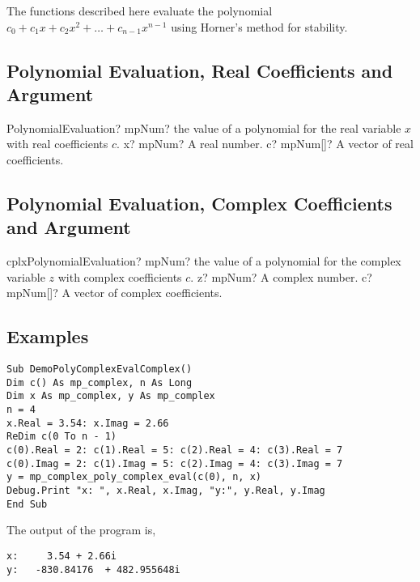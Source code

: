 The functions described here evaluate the polynomial $c_0 + c_1 x + c_2 x^2 + \ldots + c_{n- 1} x^{n-1}$ using Horner's method for stability.

\subsection{Polynomial Evaluation, Real Coefficients and Argument}

\begin{mpFunctionsExtract}
	\mpFunctionTwo
	{PolynomialEvaluation? mpNum? the value of a polynomial for the real variable $x$ with real coefficients $c$.}
	{x? mpNum? A real number.}
	{c? mpNum[]? A vector of real coefficients.}
\end{mpFunctionsExtract}



\subsection{Polynomial Evaluation, Complex Coefficients and Argument}

\begin{mpFunctionsExtract}
	\mpFunctionTwo
	{cplxPolynomialEvaluation? mpNum? the value of a polynomial for the complex variable $z$ with complex coefficients $c$.}
	{z? mpNum? A complex number.}
	{c? mpNum[]? A vector of complex coefficients.}
\end{mpFunctionsExtract}





\subsection{Examples}
\label{PolynomialEvaluationPolynomialsExamples}

\begin{lstlisting}
Sub DemoPolyComplexEvalComplex()
Dim c() As mp_complex, n As Long
Dim x As mp_complex, y As mp_complex
n = 4
x.Real = 3.54: x.Imag = 2.66
ReDim c(0 To n - 1)
c(0).Real = 2: c(1).Real = 5: c(2).Real = 4: c(3).Real = 7
c(0).Imag = 2: c(1).Imag = 5: c(2).Imag = 4: c(3).Imag = 7
y = mp_complex_poly_complex_eval(c(0), n, x)
Debug.Print "x: ", x.Real, x.Imag, "y:", y.Real, y.Imag
End Sub
\end{lstlisting}

The output of the program is,
\begin{verbatim}
x:     3.54 + 2.66i
y:   -830.84176  + 482.955648i
\end{verbatim}







